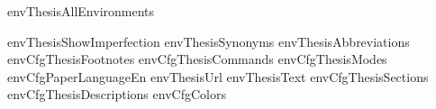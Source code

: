 \startenvironment envThesisAllEnvironments

\environment envThesisShowImperfection
\environment envThesisSynonyms
\environment envThesisAbbreviations
\environment envCfgThesisFootnotes
\environment envCfgThesisCommands
\environment envCfgThesisModes
\environment envCfgPaperLanguageEn
\environment envThesisUrl
\environment envThesisText
\environment envCfgThesisSections
\environment envCfgThesisDescriptions
\environment envCfgColors

\stopenvironment